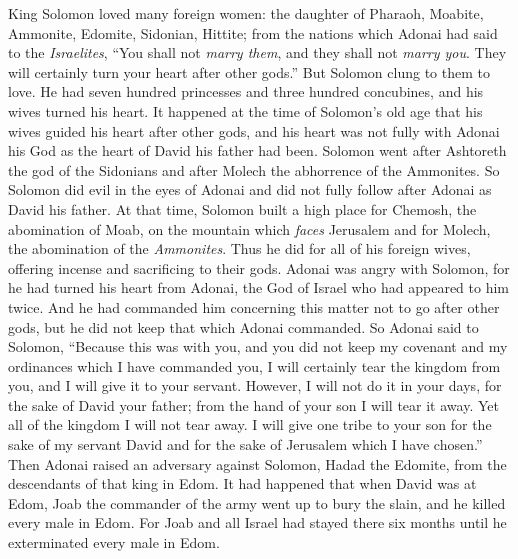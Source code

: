 \begin{biblechapter} %
 King Solomon loved many foreign women: the daughter of Pharaoh, Moabite, Ammonite, Edomite, Sidonian, Hittite;
\verse from the nations which Adonai had said to the \textit{Israelites}, “You shall not \textit{marry them}, and they shall not \textit{marry you}. They will certainly turn your heart after other gods.” But Solomon clung to them to love.
\verse He had seven hundred princesses and three hundred concubines, and his wives turned his heart.
 It happened at the time of Solomon’s old age that his wives guided his heart after other gods, and his heart was not fully with Adonai his God as the heart of David his father had been.
\verse Solomon went after Ashtoreth the god of the Sidonians and after Molech the abhorrence of the Ammonites.
\verse So Solomon did evil in the eyes of Adonai and did not fully follow after Adonai as David his father.
\verse At that time, Solomon built a high place for Chemosh, the abomination of Moab, on the mountain which \textit{faces} Jerusalem and for Molech, the abomination of the \textit{Ammonites}.
\verse Thus he did for all of his foreign wives, offering incense and sacrificing to their gods.
 Adonai was angry with Solomon, for he had turned his heart from Adonai, the God of Israel who had appeared to him twice.
\verse And he had commanded him concerning this matter not to go after other gods, but he did not keep that which Adonai commanded.
\verse So Adonai said to Solomon, “Because this was with you, and you did not keep my covenant and my ordinances which I have commanded you, I will certainly tear the kingdom from you, and I will give it to your servant.
\verse However, I will not do it in your days, for the sake of David your father; from the hand of your son I will tear it away.
\verse Yet all of the kingdom I will not tear away. I will give one tribe to your son for the sake of my servant David and for the sake of Jerusalem which I have chosen.”
\verse Then Adonai raised an adversary against Solomon, Hadad the Edomite, from the descendants of that king in Edom.
\verse It had happened that when David was at Edom, Joab the commander of the army went up to bury the slain, and he killed every male in Edom.
\verse For Joab and all Israel had stayed there six months until he exterminated every male in Edom.

\end{biblechapter}
